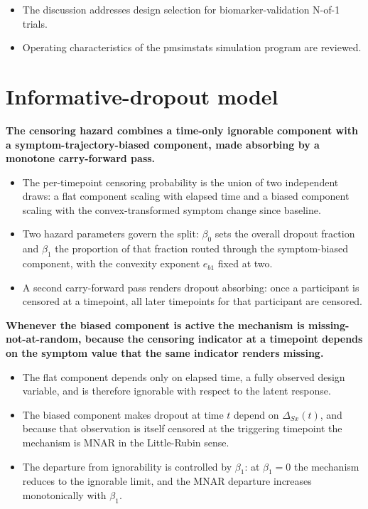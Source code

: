 \documentclass[
  11pt,
]{article}
\begin{document}
\begin{itemize}\setlength{\itemsep}{2pt}\setlength{\parskip}{0pt}
\item The discussion addresses design selection for biomarker-validation N-of-1 trials.
\item Operating characteristics of the pmsimstats simulation program are reviewed.
\end{itemize}

\section{Informative-dropout model}\label{informative-dropout-model}

\textbf{The censoring hazard combines a time-only ignorable component with a symptom-trajectory-biased component, made absorbing by a monotone carry-forward pass.}

\begin{itemize}\setlength{\itemsep}{2pt}\setlength{\parskip}{0pt}
\item The per-timepoint censoring probability is the union of two independent draws: a flat component scaling with elapsed time and a biased component scaling with the convex-transformed symptom change since baseline.
\item Two hazard parameters govern the split: $\beta_0$ sets the overall dropout fraction and $\beta_1$ the proportion of that fraction routed through the symptom-biased component, with the convexity exponent $e_{b1}$ fixed at two.
\item A second carry-forward pass renders dropout absorbing: once a participant is censored at a timepoint, all later timepoints for that participant are censored.
\end{itemize}

\textbf{Whenever the biased component is active the mechanism is missing-not-at-random, because the censoring indicator at a timepoint depends on the symptom value that the same indicator renders missing.}

\begin{itemize}\setlength{\itemsep}{2pt}\setlength{\parskip}{0pt}
\item The flat component depends only on elapsed time, a fully observed design variable, and is therefore ignorable with respect to the latent response.
\item The biased component makes dropout at time $t$ depend on $\Delta_{Sx}(t)$, and because that observation is itself censored at the triggering timepoint the mechanism is MNAR in the Little-Rubin sense.
\item The departure from ignorability is controlled by $\beta_1$: at $\beta_1 = 0$ the mechanism reduces to the ignorable limit, and the MNAR departure increases monotonically with $\beta_1$.
\end{itemize}
\end{document}
